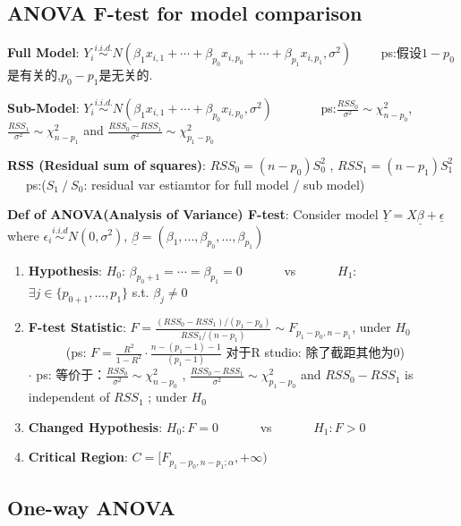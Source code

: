 \documentclass[9pt]{article}
\begin{document}
    \subsection{ANOVA F-test for model comparison}

    \textbf{Full Model}: $Y_i\stackrel{i.i.d.}{\sim}N(\beta_1x_{i,1}+\cdots+\beta_{p_0}x_{i,p_0}+\cdots+\beta_{p_1}x_{i,p_1},\sigma^2)$ \ \ \ \ ps:假设$1-p_0$是有关的,$p_0-p_1$是无关的.

    \textbf{Sub-Model}: $Y_i\stackrel{i.i.d.}{\sim}N(\beta_1x_{i,1}+\cdots+\beta_{p_0}x_{i,p_0},\sigma^2)$ \ \ \ \ \ \ \ ps:$\frac{RSS_0}{\sigma^2}\sim\chi^2_{n-p_0}$, $\frac{RSS_1}{\sigma^2}\sim\chi^2_{n-p_1}$ and $\frac{RSS_0-RSS_1}{\sigma^2}\sim\chi^2_{p_1-p_0}$

    \textbf{RSS (Residual sum of squares)}: $RSS_0=(n-p_0)S_0^2$ , $RSS_1=(n-p_1)S_1^2$ \ \ \ {\footnotesize ps:($S_1 \ / \ S_0$: residual var estiamtor for full model / sub model)}

    \textbf{Def of ANOVA(Analysis of Variance) F-test}: Consider model $\underline{Y}=\mathbf{\mathit{X}}\underline{\beta}+\underline{\epsilon}$ where $\epsilon_i\stackrel{i.i.d}{\sim}N(0,\sigma^2)$, $\underline{\beta}=(\beta_1,...,\beta_{p_0},...,\beta_{p_1})$

    \begin{enumerate}[itemsep=-2pt, topsep=-2pt]
        \item \textbf{Hypothesis}: $H_0$: $\beta_{p_0+1}=\cdots=\beta_{p_1}=0$ \ \ \ \ \ \ vs \ \ \ \ \ \ $H_1$: $\exists j\in\{p_{0+1},...,p_1\}$ s.t. $\beta_j\ne 0$
        \item \textbf{F-test Statistic}: $F=\frac{(RSS_0-RSS_1)/(p_1-p_0)}{RSS_1/(n-p_1)}\sim F_{p_1-p_0,n-p_1}$, under $H_0$ \ \ \ \ \ \ (ps: $F=\frac{R^2}{1-R^2}\cdot\frac{n-(p_1-1)-1}{(p_1-1)}$ {\footnotesize 对于R studio: 除了截距其他为0})
              \\ $\cdot$ ps: 等价于：$\frac{RSS_0}{\sigma^2}\sim\chi^2_{n-p_0}$ , $\frac{RSS_0-RSS_1}{\sigma^2}\sim\chi^2_{p_1-p_0}$ and $RSS_0-RSS_1$ is independent of $RSS_1$ ; under $H_0$
        \item \textbf{Changed Hypothesis}: $H_0:F=0$ \ \ \ \ \ \ vs \ \ \ \ \ \ $H_1:F>0$
        \item \textbf{Critical Region}: $C=[F_{p_1-p_0,n-p_1;\alpha},+\infty)$
    \end{enumerate}

    \subsection{One-way ANOVA}
\end{document}
